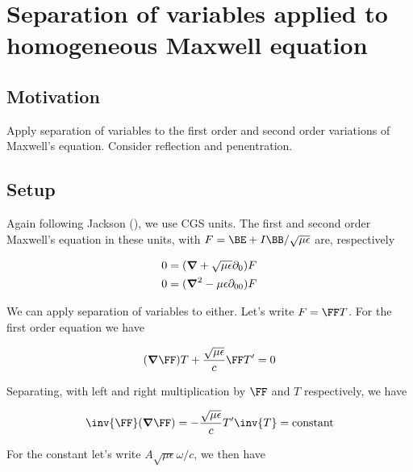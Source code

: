 

\chapter{Separation of variables applied to homogeneous Maxwell equation}
\label{chap:maxwellSepVars}
{}
\date{Aug 9, 2009}

\beginArtWithToc

\section{Motivation}

Apply separation of variables to the first order and second order variations of Maxwell's equation.  Consider reflection and penentration.

\section{Setup}

Again following Jackson (\cite{jackson1975cew}), we use CGS units.  The first and second order Maxwell's equation in these units, with $F = \BE + I\BB/\sqrt{\mu\epsilon}$ are, respectively

\begin{align}\label{eqn:foo1}
0 &= (\boldsymbol{\nabla} + \sqrt{\mu\epsilon} \partial_0) F \\
0 &= (\boldsymbol{\nabla}^2 - {\mu\epsilon} \partial_{00}) F 
\end{align}

We can apply separation of variables to either.  Let's write $F = \FF T$.  For the first order equation we have

\begin{align*}
(\spacegrad \FF) T + \frac{\sqrt{\mu\epsilon}}{c} \FF T' = 0
\end{align*}

Separating, with left and right multiplication by $\FF$ and $T$ respectively, we have

\begin{align}\label{eqn:foo2}
\inv{\FF} (\spacegrad \FF) = -\frac{\sqrt{\mu\epsilon}}{c} T' \inv{T} = \text{constant}
\end{align}

For the constant let's write $A \sqrt{\mu\epsilon} \omega/c$, we then have

